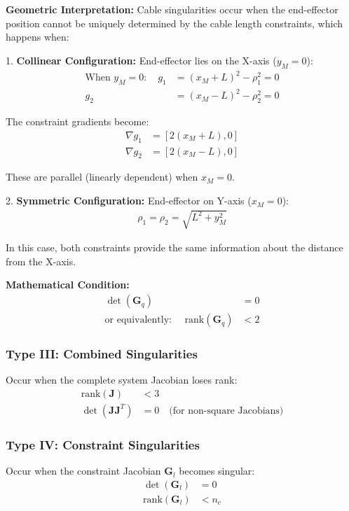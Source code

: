 \documentclass[11pt,a4paper]{article}
\begin{document}
\textbf{Geometric Interpretation:}
Cable singularities occur when the end-effector position cannot be uniquely determined by the cable length constraints, which happens when:

1. \textbf{Collinear Configuration:} End-effector lies on the X-axis ($y_M = 0$):
\begin{align}
\text{When } y_M = 0: \quad g_1 &= (x_M + L)^2 - \rho_1^2 = 0 \\
g_2 &= (x_M - L)^2 - \rho_2^2 = 0
\end{align}

The constraint gradients become:
\begin{align}
\nabla g_1 &= [2(x_M + L), 0] \\
\nabla g_2 &= [2(x_M - L), 0]
\end{align}

These are parallel (linearly dependent) when $x_M = 0$.

2. \textbf{Symmetric Configuration:} End-effector on Y-axis ($x_M = 0$):
\begin{align}
\rho_1 = \rho_2 = \sqrt{L^2 + y_M^2}
\end{align}

In this case, both constraints provide the same information about the distance from the X-axis.

\textbf{Mathematical Condition:}
\begin{align}
\det(\bm{G}_q) &= 0 \\
\text{or equivalently: } \quad \text{rank}(\bm{G}_q) &< 2
\end{align}

\subsubsection{Type III: Combined Singularities}
Occur when the complete system Jacobian loses rank:
\begin{align}
\text{rank}(\bm{J}) &< 3 \\
\det(\bm{J}\bm{J}^T) &= 0 \quad \text{(for non-square Jacobians)}
\end{align}

\subsubsection{Type IV: Constraint Singularities}
Occur when the constraint Jacobian $\bm{G}_l$ becomes singular:
\begin{align}
\det(\bm{G}_l) &= 0 \\
\text{rank}(\bm{G}_l) &< n_c
\end{align}
\end{document}
